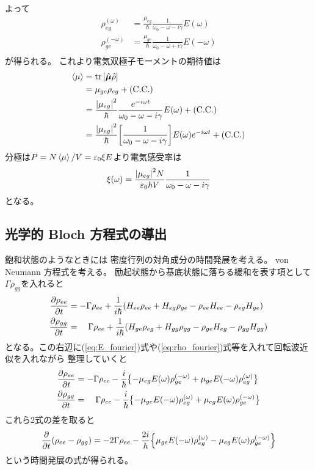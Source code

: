 \documentclass[11pt,dvipdfmx,a4paper]{jsarticle}
\newcommand{\cc}{\text{(C.C.)}}
\begin{document}
よって
\begin{align}
	\rho_{eg}^{(\omega)}
	&= \frac{\mu_{eg}}{\hbar}\frac{1}{\omega_0 - \omega - i\gamma} E( \omega)\\
	\rho_{ge}^{(-\omega)}
	&= \frac{\mu_{ge}}{\hbar}\frac{1}{\omega_0 - \omega + i\gamma} E(-\omega)\\
\end{align}
が得られる。
これより電気双極子モーメントの期待値は
\begin{align}
	\ev{\mu} &= \tr\qty[\hat{\vb*{\mu}}\hat{\rho}]\\
	&=\mu_{ge}\rho_{eg}+\cc\\
	&=\frac{\abs{\mu_{eg}}^2}{\hbar}\frac{e^{-i\omega t}}{\omega_0 - \omega - i\gamma} E( \omega)
	+ \cc\\
	&=\frac{\abs{\mu_{eg}}^2}{\hbar}\qty[
		 \frac{1}{\omega_0 - \omega - i\gamma}]
	E(\omega)e^{-i\omega t} + \cc
\end{align}
分極は\(P=N\ev{\mu}/V=\varepsilon_0\xi E\)より電気感受率は
\begin{equation}
	\xi(\omega) = \frac{\abs{\mu_{eg}}^2N}{\varepsilon_0\hbar V}\frac{1}{\omega_0-\omega -i\gamma}
\end{equation}
となる。

\subsection{光学的 Bloch 方程式の導出}
飽和状態のようなときには
密度行列の対角成分の時間発展を考える。
von Neumann 方程式を考える。
励起状態から基底状態に落ちる緩和を表す項として\(\Gamma\rho_{gg}\)を入れると
\begin{align}
	\pdv{\rho_{ee}}{t} &= -\Gamma\rho_{ee}+\frac{1}{i\hbar} \qty(H_{ee}\rho_{ee} + H_{eg}\rho_{ge}
	- \rho_{ee}H_{ee} - \rho_{eg}H_{ge})\\
	\pdv{\rho_{gg}}{t} &= \quad\Gamma\rho_{ee}+\frac{1}{i\hbar} \qty(H_{ge}\rho_{eg} + H_{gg}\rho_{gg}
	- \rho_{ge}H_{eg} - \rho_{gg}H_{gg})\\
\end{align}
となる。この右辺に(\ref{eq:E_fourier})式や(\ref{eq:rho_fourier})式等を入れて回転波近似を入れながら
整理していくと
\begin{align}
	\pdv{\rho_{ee}}{t} &= -\Gamma\rho_{ee} -\frac{i}{\hbar}
	\bigl\{-\mu_{eg}E(\omega)\rho_{ge}^{(-\omega)}
	+\mu_{ge}E(-\omega)\rho_{eg}^{(\omega)} \bigr\}\\
	\pdv{\rho_{gg}}{t} &= \quad\Gamma\rho_{ee} -\frac{i}{\hbar}
	\bigl\{-\mu_{ge}E(-\omega)\rho_{eg}^{(\omega)}
	+\mu_{eg}E(\omega)\rho_{ge}^{(-\omega)} \bigr\}
\end{align}
これら2式の差を取ると
\begin{equation}
	\pdv{t}(\rho_{ee}-\rho_{gg}) = - 2\Gamma\rho_{ee}
	- \frac{2i}{\hbar}\Bigl\{\mu_{ge}E(-\omega)\rho_{eg}^{(\omega)}
	-\mu_{eg}E(\omega)\rho_{ge}^{(-\omega)} \Bigr\}
\end{equation}
という時間発展の式が得られる。
\end{document}
